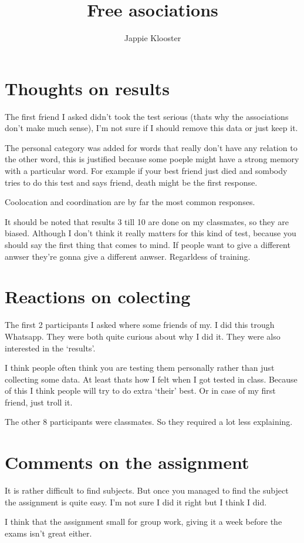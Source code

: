 \documentclass{article}
\begin{document}
\author{Jappie Klooster}
\title{Free asociations}
\maketitle

\section{Thoughts on results}
The first friend I asked didn't took the
test serious (thats why the associations don't make much sense), I'm not
sure if I should remove this data or just keep it.

The personal category was added for words that really don't have any
relation to the other word, this is justified because some poeple might
have a strong memory with a particular word. For example if your best
friend just died and sombody tries to do this test and says friend,
death might be the first response.

Coolocation and coordination are by far the most common responses.

It should be noted that results 3 till 10 are done on my classmates,
so they are biased. Although I don't think it really matters for this
kind of test, because you should say the first thing that comes to mind.
If people want to give a different anwser they're gonna give a different
anwser. Regarldess of training.

\section{Reactions on colecting}
The first 2 participants I asked where some friends of my. I did this trough
Whatsapp. They were both quite curious about why I did it. They were also
interested in the `results'.

I think people often think you are testing them personally rather than
just collecting some data. At least thats how I felt when I got tested in class.
Because of this I think people will try to do extra `their' best.
Or in case of my first friend, just troll it.

The other 8 participants were classmates. So they required a lot less explaining.

\section{Comments on the assignment}
It is rather difficult to find subjects. But once you managed to find the
subject the assignment is quite easy. I'm not sure I did it right but I
think I did.

I think that the assignment small for group work,
giving it a week before the exams isn't great either.
\end{document}

